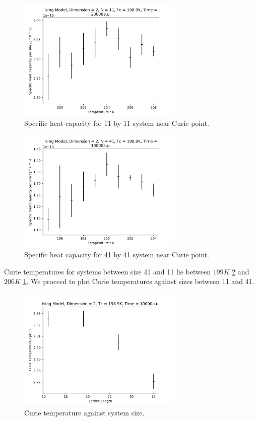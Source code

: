 \documentclass[%
showkeys,
bibnotes,
amsmath,amssymb,
floatfix,
]{revtex4-1}
\begin{document}
\begin{figure}[H] \centering
	\includegraphics[width=0.7\textwidth]{../figures/size11scan}
	\caption{\label{fig:size11scan} Specific heat capacity for 11 by 11 system near Curie point.}
\end{figure}

\begin{figure}[H] \centering
	\includegraphics[width=0.7\textwidth]{../figures/size41scan}
	\caption{\label{fig:size41scan} Specific heat capacity for 41 by 41 system near Curie point.}
\end{figure}

Curie temperatures for systems between size 41 and 11 lie between $199K$ \ref{fig:size41scan} and $206K$ \ref{fig:size11scan}. We proceed to plot Curie temperatures against sizes between 11 and 41.


\begin{figure}[H] \centering
	\includegraphics[width=0.7\textwidth]{../figures/curie_temp_vs_size2}
	\caption{\label{fig:curie_temp_vs_size2} Curie temperature against system size.}
\end{figure}
\end{document}
